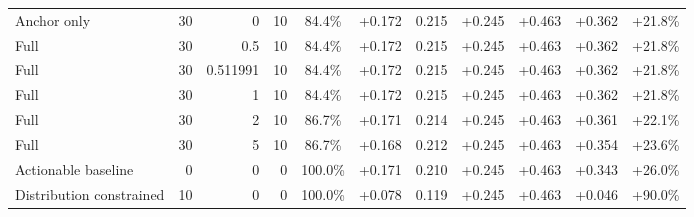 \begin{table}[htbp]
\begin{tabular}{lrrrccccccc}
Anchor only & 30 & 0 & 10 & 84.4\% & +0.172 & 0.215 & +0.245 & +0.463 & +0.362 & +21.8\% \\
Full & 30 & 0.5 & 10 & 84.4\% & +0.172 & 0.215 & +0.245 & +0.463 & +0.362 & +21.8\% \\
Full & 30 & 0.511991 & 10 & 84.4\% & +0.172 & 0.215 & +0.245 & +0.463 & +0.362 & +21.8\% \\
Full & 30 & 1 & 10 & 84.4\% & +0.172 & 0.215 & +0.245 & +0.463 & +0.362 & +21.8\% \\
Full & 30 & 2 & 10 & 86.7\% & +0.171 & 0.214 & +0.245 & +0.463 & +0.361 & +22.1\% \\
Full & 30 & 5 & 10 & 86.7\% & +0.168 & 0.212 & +0.245 & +0.463 & +0.354 & +23.6\% \\
Actionable baseline & 0 & 0 & 0 & 100.0\% & +0.171 & 0.210 & +0.245 & +0.463 & +0.343 & +26.0\% \\
Distribution constrained & 10 & 0 & 0 & 100.0\% & +0.078 & 0.119 & +0.245 & +0.463 & +0.046 & +90.0\% \\
\bottomrule
\end{tabular}
\end{table}